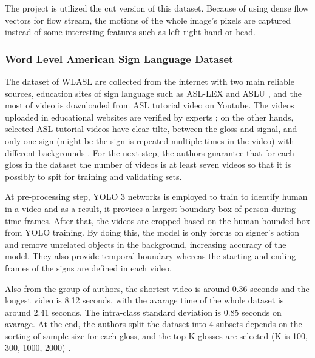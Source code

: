 \documentclass[a4paper, 12pt]{article}
\begin{document}
The project is utilized the cut version of this dataset. Because of using dense flow vectors for flow stream, the motions of the whole image's pixels are captured instead of some interesting features such as left-right hand or head.

\subsubsection{Word Level American Sign Language Dataset}
The dataset of WLASL are collected from the internet with two main reliable sources, education sites of sign language such as ASL-LEX and ASLU \citep{li2020word}, and the most of video is downloaded from ASL tutorial video on Youtube. The videos uploaded in educational websites are verified by experts \citep{aslds, caselli2017asl}; on the other hands, selected ASL tutorial videos have clear tilte, between the gloss and signal, and only one sign (might be the sign is repeated multiple times in the video) with different backgrounds \citep{li2020word}. For the next step, the authors guarantee that for each gloss in the dataset the number of videos is at least seven videos so that it is possibly to spit for training and validating sets.

At pre-processing step, YOLO 3 networks is employed to train to identify human in a video and as a result, it provices a largest boundary box of person during time frames. After that, the videos are cropped based on the human bounded box from YOLO training. By doing this, the model is only forcus on signer's action and remove unrelated objects in the background, increasing accuracy of the model. They also provide temporal boundary whereas the starting and ending frames of the signs are defined in each video.

Also from the group of authors, the shortest video is around 0.36 seconds and the longest video is 8.12 seconds, with the avarage time of the whole dataset is around 2.41 seconds. The intra-class standard deviation is 0.85 seconds on avarage. At the end, the authors split the dataset into 4 subsets depends on the sorting of sample size for each gloss, and the top K glosses are selected (K is 100, 300, 1000, 2000) \citep{li2020word}.

\begin{table}[H]
    \centering
    \caption{Statistic with WLASL dataset}
    \label{tab:WLASL statistic}
    \end{table}
\end{document}
